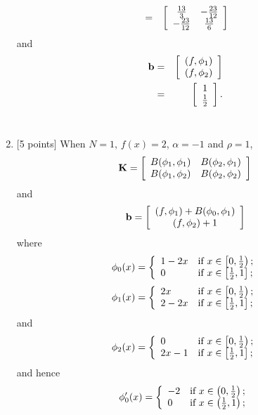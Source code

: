 \begin{solution}
\begin{enumerate}
\begin{eqnarray*}
\\
&=&\left[\begin{array}{cc} {13 \over 3} & -{23 \over 12} \\ -{23 \over 12} & {13 \over 6}\end{array}\right]
\end{eqnarray*}
and
\begin{eqnarray*}
{\bf b}&=&\left[\begin{array}{c}(f,\phi_1) \\ (f,\phi_2)\end{array}\right]
\\
&=&\left[\begin{array}{c}1 \\ {1 \over 2}\end{array}\right].
\end{eqnarray*}
\\
\item {[5 points]} When $N=1$, $f(x)=2$, $\alpha=-1$ and $\rho=1$,
\[
{\bf K}=\left[\begin{array}{cc} B(\phi_1,\phi_1) & B(\phi_2,\phi_1) \\ B(\phi_1,\phi_2) & B(\phi_2,\phi_2)\end{array}\right]
\]
and
\[
{\bf b}=\left[\begin{array}{c}(f,\phi_1)+B(\phi_0,\phi_1) \\ (f,\phi_2)+1\end{array}\right]
\]
where
\[
\phi_0(x) = \left\{\begin{array}{ll}
1-2x & \mbox{if }x\in\left[0,{1 \over 2}\right); \\ 0 & \mbox{if }x\in\left[{1 \over 2},1\right];\end{array}\right.
\]
\[
\phi_1(x) = \left\{\begin{array}{ll}
2x & \mbox{if }x\in\left[0,{1 \over 2}\right); \\ 2-2x & \mbox{if }x\in\left[{1 \over 2},1\right];\end{array}\right.
\]
and
\[
\phi_2(x) = \left\{\begin{array}{ll}
0 & \mbox{if }x\in\left[0,{1 \over 2}\right); \\ 2x-1 & \mbox{if }x\in\left[{1 \over 2},1\right];\end{array}\right.
\]
and hence
\[
\phi_0'(x) = \left\{\begin{array}{ll}
-2 & \mbox{if }x\in\left(0,{1 \over 2}\right); \\ 0 & \mbox{if }x\in\left({1 \over 2},1\right);\end{array}\right.
\]
\end{enumerate}
\end{solution}
